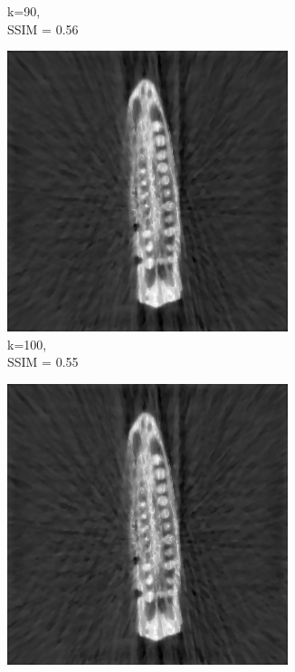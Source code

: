 \documentclass[journal]{IEEEtran}
\begin{document}
\begin{figure}[h]
\begin{subfigure}[b]{0.24\linewidth}
        \caption{k=90,\\ SSIM = 0.56}
     \end{subfigure}
   \begin{subfigure}[b]{0.24\linewidth}
        \includegraphics[width=\textwidth]{../images/okra/post_TCI/2D/48_views/tuning_k/weighted_prior_kk_100_lambda_prior_0.700000.png}
        \caption{k=100,\\ SSIM = 0.55}
     \end{subfigure}
   \begin{subfigure}[b]{0.24\linewidth}
        \includegraphics[width=\textwidth]{../images/okra/post_TCI/2D/48_views/tuning_k/weighted_prior_kk_130_lambda_prior_0.700000.png}

\end{subfigure}
\end{figure}
\end{document}
